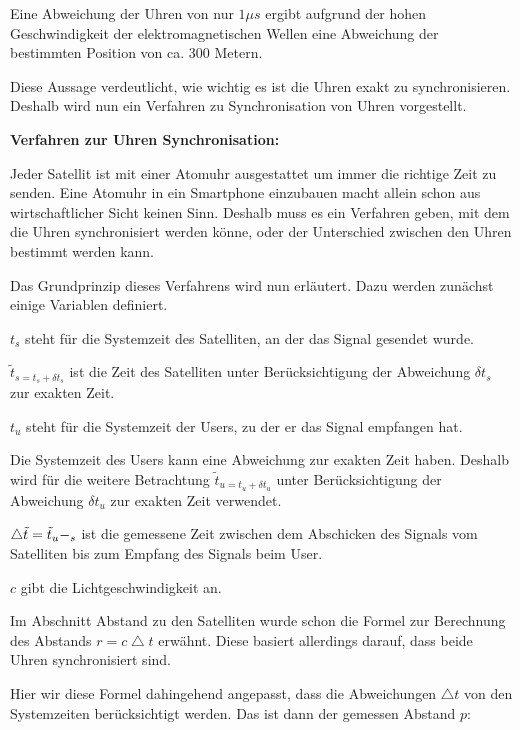 Eine Abweichung der Uhren von nur $1\mu s$ ergibt aufgrund der hohen Geschwindigkeit der elektromagnetischen Wellen eine Abweichung der bestimmten Position von ca. 300 Metern.
\cite[S. 189]{Schiller2004}

Diese Aussage verdeutlicht, wie wichtig es ist die Uhren exakt zu synchronisieren. Deshalb wird nun ein Verfahren zu Synchronisation von Uhren vorgestellt.


\textbf{Verfahren zur Uhren Synchronisation:}

Jeder Satellit ist mit einer Atomuhr ausgestattet um immer die richtige Zeit zu senden. Eine Atomuhr in ein Smartphone einzubauen macht allein schon aus wirtschaftlicher Sicht keinen Sinn. Deshalb muss es ein Verfahren geben, mit dem die Uhren synchronisiert werden könne, oder der Unterschied zwischen den Uhren bestimmt werden kann.
\cite[S.189]{Schiller2004}

Das Grundprinzip dieses Verfahrens wird nun erläutert. Dazu werden zunächst einige Variablen definiert.

$ t_{s} $ steht für die Systemzeit des Satelliten, an der das Signal gesendet wurde.

$ \tilde{t}_{s = t_{s} + \delta t_{s}} $ ist die Zeit des Satelliten unter Berücksichtigung der Abweichung $ \delta t_{s} $ zur exakten Zeit.

$ t_{u} $ steht für die Systemzeit der Users, zu der er das Signal empfangen hat.

Die Systemzeit des Users kann eine Abweichung zur exakten Zeit haben. Deshalb wird für die weitere Betrachtung $ \tilde{t}_{u = t_{u} + \delta t_{u}} $ unter Berücksichtigung der Abweichung $ \delta t_{u} $ zur exakten Zeit verwendet.

$ \bigtriangleup \tilde{t} = \tilde{t}_{u} - \title{t}_{s} $ ist die gemessene Zeit zwischen dem Abschicken des Signals vom Satelliten bis zum Empfang des Signals beim User.

$ c $ gibt die Lichtgeschwindigkeit an.

Im Abschnitt \glqq Abstand zu den Satelliten \grqq wurde schon die Formel zur Berechnung des Abstands $ r = c \bigtriangleup t $ erwähnt. Diese basiert allerdings darauf, dass beide Uhren synchronisiert sind.

Hier wir diese Formel dahingehend angepasst, dass die Abweichungen $\bigtriangleup t$ von den Systemzeiten berücksichtigt werden. Das ist dann der gemessen Abstand $p$:

\grqq \cite[S. 189 - 190]{Schiller2004}

